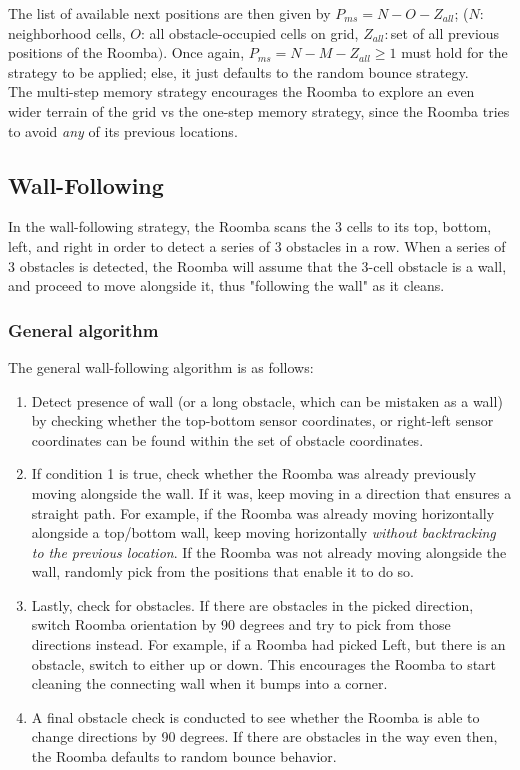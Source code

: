 \documentclass[11pt]{article}
\begin{document}
The list of available next positions are then given by  \(P_{ms} = N - O - Z_{all}\);
 (\(N\): neighborhood cells, \(O\): all obstacle-occupied
cells on grid, \(Z_{all}:\)set of all previous positions of the
Roomba\()\). Once again, \(P_{ms} = N - M - Z_{all}\geq 1\) must hold
for the strategy to be applied; else, it just defaults to the random
bounce strategy.\\

The multi-step memory strategy encourages the Roomba to explore an even
wider terrain of the grid vs the one-step memory strategy, since the
Roomba tries to avoid \emph{any} of its previous locations.

\subsection{Wall-Following}

In the wall-following strategy, the Roomba scans the 3 cells to its top,
bottom, left, and right in order to detect a series of 3 obstacles in a
row. When a series of 3 obstacles is detected, the Roomba will assume
that the 3-cell obstacle is a wall, and proceed to move alongside it,
thus "following the wall" as it cleans.

\subsubsection{General algorithm}

The general wall-following algorithm is as follows:

\begin{enumerate}
\def\labelenumi{\arabic{enumi})}
\item
  Detect presence of wall (or a long obstacle, which can be mistaken as
  a wall) by checking whether the top-bottom sensor coordinates, or
  right-left sensor coordinates can be found within the set of obstacle
  coordinates.
\item
  If condition 1 is true, check whether the Roomba was already
  previously moving alongside the wall. If it was, keep moving in a
  direction that ensures a straight path. For example, if the Roomba was
  already moving horizontally alongside a top/bottom wall, keep moving
  horizontally \emph{without backtracking to the previous location}. If
  the Roomba was not already moving alongside the wall, randomly pick
  from the positions that enable it to do so.
\item
  Lastly, check for obstacles. If there are obstacles in the picked
  direction, switch Roomba orientation by 90 degrees and try to pick
  from those directions instead. For example, if a Roomba had picked
  Left, but there is an obstacle, switch to either up or down. This
  encourages the Roomba to start cleaning the connecting wall when it
  bumps into a corner.
\item
  A final obstacle check is conducted to see whether the Roomba is able
  to change directions by 90 degrees. If there are obstacles in the way
  even then, the Roomba defaults to random bounce behavior.
\end{enumerate}
\end{document}

